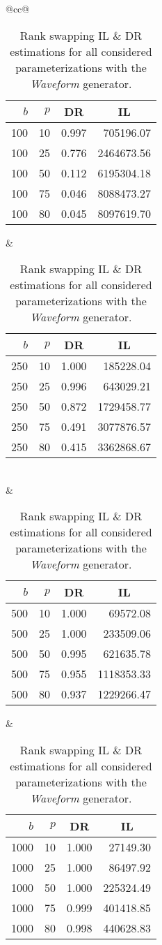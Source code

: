 \begin{table}[H]
	\centering
	\begin{tabular}{@{}cc@{}}
		\begin{tabular}{@{}rrrr@{}}
			\toprule
			$b$ & $p$ & \multicolumn{1}{c}{DR} & \multicolumn{1}{c}{IL} \\ \midrule
			100  & 10 & 0.997 & 705196.07  \\
			100  & 25 & 0.776 & 2464673.56 \\
			100  & 50 & 0.112 & 6195304.18 \\
			100  & 75 & 0.046 & 8088473.27 \\
			100  & 80 & 0.045 & 8097619.70 \\ \bottomrule
		\end{tabular}
		&
		\begin{tabular}{@{}rrrr@{}}
			\toprule
			$b$ & $p$ & \multicolumn{1}{c}{DR} & \multicolumn{1}{c}{IL} \\ \midrule
			250  & 10 & 1.000 & 185228.04  \\
			250  & 25 & 0.996 & 643029.21  \\
			250  & 50 & 0.872 & 1729458.77 \\
			250  & 75 & 0.491 & 3077876.57 \\
			250  & 80 & 0.415 & 3362868.67 \\ \bottomrule
		\end{tabular}
		\\ & \\
		\begin{tabular}{@{}rrrr@{}}
			\toprule
			$b$ & $p$ & \multicolumn{1}{c}{DR} & \multicolumn{1}{c}{IL} \\ \midrule
			500  & 10 & 1.000 & 69572.08   \\
			500  & 25 & 1.000 & 233509.06  \\
			500  & 50 & 0.995 & 621635.78  \\
			500  & 75 & 0.955 & 1118353.33 \\
			500  & 80 & 0.937 & 1229266.47 \\ \bottomrule
		\end{tabular}
		&
		\begin{tabular}{@{}rrrr@{}}
			\toprule
			$b$ & $p$ & \multicolumn{1}{c}{DR} & \multicolumn{1}{c}{IL} \\ \midrule
			1000 & 10 & 1.000 & 27149.30   \\
			1000 & 25 & 1.000 & 86497.92   \\
			1000 & 50 & 1.000 & 225324.49  \\
			1000 & 75 & 0.999 & 401418.85  \\
			1000 & 80 & 0.998 & 440628.83  \\ \bottomrule
		\end{tabular}
	\end{tabular}
	\caption[Rank swapping DR \& IL estimations (Waveform).]{Rank swapping IL \& DR estimations for all considered parameterizations with the \textit{Waveform} generator.}
\end{table}

